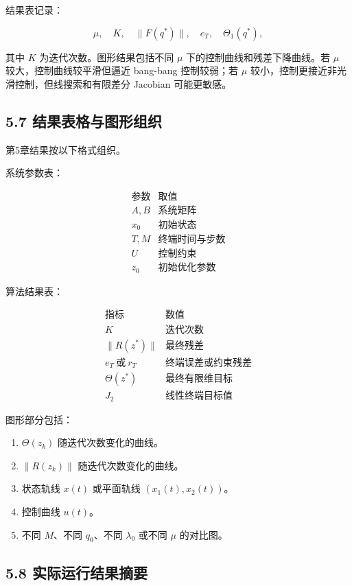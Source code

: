 \documentclass[UTF8,a4paper,zihao=-4]{ctexart}
\begin{document}
结果表记录：

\[
\mu,\quad K,\quad \|F(q^*)\|,\quad e_T,\quad \Theta_1(q^*),
\]

其中 $K$ 为迭代次数。图形结果包括不同 $\mu$ 下的控制曲线和残差下降曲线。若 $\mu$ 较大，控制曲线较平滑但逼近 bang-bang 控制较弱；若 $\mu$ 较小，控制更接近非光滑控制，但线搜索和有限差分 Jacobian 可能更敏感。

\subsection{5.7 结果表格与图形组织}

第5章结果按以下格式组织。

系统参数表：

\[
\begin{array}{c|c}
\text{参数} & \text{取值}\\
\hline
A,B & \text{系统矩阵}\\
x_0 & \text{初始状态}\\
T,M & \text{终端时间与步数}\\
U & \text{控制约束}\\
z_0 & \text{初始优化参数}
\end{array}
\]

算法结果表：

\[
\begin{array}{c|c}
\text{指标} & \text{数值}\\
\hline
K & \text{迭代次数}\\
\|R(z^*)\| & \text{最终残差}\\
e_T\ \text{或}\ r_T & \text{终端误差或约束残差}\\
\Theta(z^*) & \text{最终有限维目标}\\
J_2 & \text{线性终端目标值}
\end{array}
\]

图形部分包括：

\begin{enumerate}
\item $\Theta(z_k)$ 随迭代次数变化的曲线。
\item $\|R(z_k)\|$ 随迭代次数变化的曲线。
\item 状态轨线 $x(t)$ 或平面轨线 $(x_1(t),x_2(t))$。
\item 控制曲线 $u(t)$。
\item 不同 $M$、不同 $q_0$、不同 $\lambda_0$ 或不同 $\mu$ 的对比图。
\end{enumerate}

\subsection{5.8 实际运行结果摘要}
\end{document}
